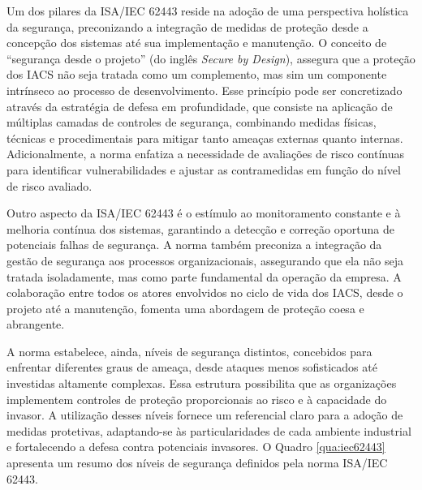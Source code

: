         Um dos pilares da ISA/IEC 62443 reside na adoção de uma perspectiva holística da segurança, preconizando a integração de medidas de proteção desde a concepção dos sistemas até sua implementação e manutenção. O conceito de ``segurança desde o projeto'' (do inglês \textit{Secure by Design}), assegura que a proteção dos IACS não seja tratada como um complemento, mas sim um componente intrínseco ao processo de desenvolvimento. Esse princípio pode ser concretizado através da estratégia de defesa em profundidade, que consiste na aplicação de múltiplas camadas de controles de segurança, combinando medidas físicas, técnicas e procedimentais para mitigar tanto ameaças externas quanto internas. Adicionalmente, a norma enfatiza a necessidade de avaliações de risco contínuas para identificar vulnerabilidades e ajustar as contramedidas em função do nível de risco avaliado.

        Outro aspecto da ISA/IEC 62443 é o estímulo ao monitoramento constante e à melhoria contínua dos sistemas, garantindo a detecção e correção oportuna de potenciais falhas de segurança. A norma também preconiza a integração da gestão de segurança aos processos organizacionais, assegurando que ela não seja tratada isoladamente, mas como parte fundamental da operação da empresa. A colaboração entre todos os atores envolvidos no ciclo de vida dos IACS, desde o projeto até a manutenção, fomenta uma abordagem de proteção coesa e abrangente.

        A norma estabelece, ainda, níveis de segurança distintos, concebidos para enfrentar diferentes graus de ameaça, desde ataques menos sofisticados até investidas altamente complexas. Essa estrutura possibilita que as organizações implementem controles de proteção proporcionais ao risco e à capacidade do invasor. A utilização desses níveis fornece um referencial claro para a adoção de medidas protetivas, adaptando-se às particularidades de cada ambiente industrial e fortalecendo a defesa contra potenciais invasores. O Quadro \ref{qua:iec62443} apresenta um resumo dos níveis de segurança definidos pela norma ISA/IEC 62443.

